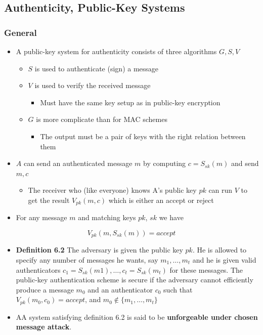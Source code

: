 \documentclass[11pt]{article}
\begin{document}
\subsection{Authenticity, Public-Key Systems}
\label{sec:org31fd947}
\subsubsection{General}
\label{sec:orge0f1b93}
\begin{itemize}
\item A public-key system for authenticity consists of three algorithms \(G, S, V\)
\begin{itemize}
\item \(S\) is used to authenticate (sign) a message
\item \(V\) is used to verify the received message
\begin{itemize}
\item Must have the same key setup as in public-key encryption
\end{itemize}
\item \(G\) is more complicate than for MAC schemes
\begin{itemize}
\item The output must be a pair of keys with the right relation between them
\end{itemize}
\end{itemize}

\item \(A\) can send an authenticated message \(m\) by computing \(c=S_{sk}(m)\) and send \(m,c\)
\begin{itemize}
\item The receiver who (like everyone) knows A's public key \(pk\) can run \(V\) to get the result \(V_{pk}(m,c)\) which is either an accept or reject
\end{itemize}

\item For any message \(m\) and matching keys \(pk\), \(sk\) we have
\end{itemize}
\begin{equation}
  V_{pk}(m,S_{sk}(m))=accept
\end{equation}

\begin{itemize}
\item \textbf{Definition 6.2} The adversary is given the public key \(pk\). He is allowed to specify any number of messages he wants, say \(m_1, \dots, m_t\) and he is given valid authenticators \(c_1=S_{sk}(m1), \dots, c_t=S_{sk}(m_t)\) for these messages. The public-key authentication scheme is secure if the adversary cannot efficiently produce a message \(m_0\) and an authenticator \(c_0\) such that \(V_{pk}(m_0, c_0) = accept\), and \(m_0 \notin \{m_1, \dots, m_t\}\)

\item AA system satisfying definition 6.2 is said to be \textbf{unforgeable under chosen message attack}.
\end{itemize}
\end{document}
